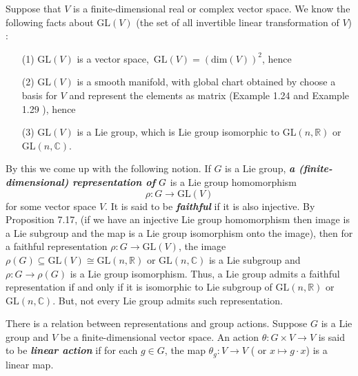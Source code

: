 \documentclass[a4paper]{article}
\theoremstyle{remark}
\newcommand{\er}{\mathbb{R}} %
\newcommand{\subhim}{\subseteq} %
\newcommand{\GL}{\text{GL}(n,\er)} %
\newcommand{\isomorphic}{\cong} %
\begin{document}
Suppose that $V$ is a finite-dimensional real or complex vector space. We know the following facts about GL$(V)$ (the set of all invertible linear transformation of $V$) :
\begin{enumerate}[nolistsep]
\item[(1)] GL$(V)$ is a vector space, \,$\text{GL}(V) = (\text{dim}(V))^2$, hence
\item[(2)] GL$(V)$ is a smooth manifold, with global chart obtained by choose a basis for $V$ and represent the elements as matrix (Example 1.24 and Example 1.29 \cite{LeeSM}), hence
\item[(3)] GL$(V)$ is a Lie group, which is Lie group isomorphic to GL$(n,\er)$ or GL$(n,\mathbb{C})$.
\end{enumerate}
By this we come up with the following notion. If $G$ is a Lie group, \textit{\textbf{a (finite-dimensional) representation of}} $\boldmath{G}$ is a Lie group homomorphism $$\rho : G \to \text{GL}(V)$$ for some vector space $V$. It is said to be \textit{\textbf{faithful}} if it is also injective. By Proposition 7.17, (if we have an injective Lie group homomorphism then image is a Lie subgroup and the map is a Lie group isomorphism onto the image), then for a faithful representation $\rho : G \to \text{GL}(V)$, the image $\rho(G) \subhim \text{GL}(V) \isomorphic \GL$ or $\text{GL}(n,\mathbb{C})$ is a Lie subgroup and $\rho : G \to \rho(G)$ is a Lie group isomorphism. Thus, a Lie group admits a faithful representation if and only if it is isomorphic to Lie subgroup of $\GL$ or $\text{GL}(n,\mathbb{C})$. But, not every Lie group admits such representation.

There is a relation between representations and group actions. Suppose $G$ is a Lie group and $V$
be a finite-dimensional vector space. An action $\theta : G \times V \to V$ is said to be \textit{\textbf{linear action}} if for each $g \in G$, the map $\theta_g : V \to V$ ( or $x \mapsto g \cdot x$) is a linear map.
\end{document}
